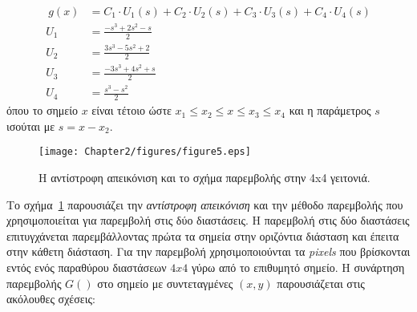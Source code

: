 \begin{subequations}
\label{equation:eqtn24}
\begin{align}
\ g(x)&=C_{1}\cdot U_{1}(s) + C_{2}\cdot U_{2}(s) + C_{3}\cdot U_{3}(s) + C_{4}\cdot U_{4}(s)\label{equation:eqtn24a}\\
U_{1}&=\frac{-s^{3} + 2s^{2} - s}{2}\label{equation:eqtn24b}\\
U_{2}&=\frac{3s^{3} - 5s^{2} + 2}{2}\label{equation:eqtn24c}\\
U_{3}&=\frac{-3s^{3} + 4s^{2} + s}{2}\label{equation:eqtn24d}\\
U_{4}&=\frac{s^{3} - s^{2}}{2}\label{equation:eqtn24e}
\end{align}
\end{subequations}
\noindent
όπου το σημείο \(x\) είναι τέτοιο ώστε \(x_{1} \leq x_{2} \leq x \leq x_{3} \leq x_{4} \) και η παράμετρος \(s\) ισούται με \( s = x - x_{2} \).

\begin{figure}
\centering
\texttt{[image: Chapter2/figures/figure5.eps]}
\caption{H αντίστροφη απεικόνιση και το σχήμα παρεμβολής στην 4x4 γειτονιά.}
\label{figure:fig25}
\end{figure}
Το σχήμα~\ref{figure:fig25} παρουσιάζει την \textsl{αντίστροφη απεικόνιση} και την μέθοδο παρεμβολής που χρησιμοποιείται για παρεμβολή στις δύο διαστάσεις. Η παρεμβολή στις δύο διαστάσεις επιτυγχάνεται παρεμβάλλοντας πρώτα τα σημεία στην οριζόντια διάσταση και έπειτα στην κάθετη διάσταση. Για την παρεμβολή χρησιμοποιούνται τα \textsl{pixels} που βρίσκονται εντός ενός παραθύρου διαστάσεων \(4x4\) γύρω από το επιθυμητό σημείο. Η συνάρτηση παρεμβολής \(G()\) στο σημείο με συντεταγμένες \((x, y)\) παρουσιάζεται στις ακόλουθες σχέσεις:

